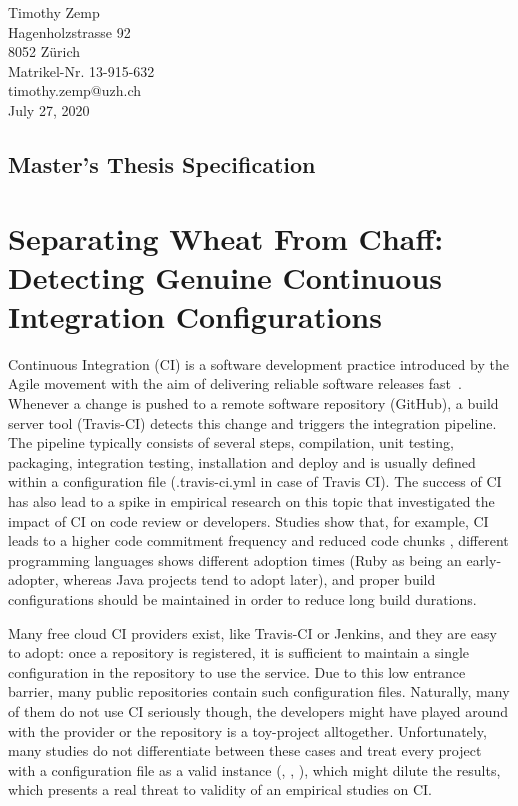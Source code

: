 \documentclass{task_description}
\begin{document}
\thispagestyle{firstpage}
\vspace*{23mm}%
\hfill\parbox[t]{65mm}{

Timothy Zemp\\
Hagenholzstrasse 92\\
8052 Z\"urich\\[5mm]
Matrikel-Nr. 13-915-632\\
timothy.zemp@uzh.ch\\[15mm]
July 27, 2020 \\
}
\vspace*{5mm}
\subsection*{Master's Thesis Specification}

\section*{Separating Wheat From Chaff: Detecting Genuine Continuous Integration Configurations}

Continuous Integration (CI) is a software development practice introduced by the Agile movement with the aim of delivering reliable software releases fast~\cite{Humble:2010}.
Whenever a change is pushed to a remote software repository (\eg GitHub), a build server tool (\eg Travis-CI) detects this change and triggers the integration pipeline.
The pipeline typically consists of several steps, \ie compilation, unit testing, packaging, integration testing, installation and deploy and is usually defined within a configuration file (\eg {}.travis-ci.yml in case of Travis CI).
The success of CI has also lead to a spike in empirical research on this topic that investigated the impact of CI on code review or developers.
Studies show that, for example, CI leads to a higher code commitment frequency and reduced code chunks \cite{zhao2017impact}, different programming languages shows different adoption times (\eg Ruby as being an early-adopter, whereas Java projects tend to adopt later)\cite{vasilescu2014continuous}, and proper build configurations should be maintained in order to reduce long build durations\cite{ghaleb2019empirical}.

Many free cloud CI providers exist, like Travis-CI or Jenkins, and they are easy to adopt: once a repository is registered, it is sufficient to maintain a single configuration in the repository to use the service.
Due to this low entrance barrier, many public repositories contain such configuration files.
Naturally, many of them do not use CI seriously though, the developers might have played around with the provider or the repository is a toy-project alltogether.
Unfortunately, many studies do not differentiate between these cases and treat every project with a configuration file as a valid instance (\eg \cite{zhao2017impact}, \cite{vasilescu2014continuous}, \cite{ghaleb2019empirical}), which might dilute the results, which presents a real threat to validity of an empirical studies on CI.
\end{document}
